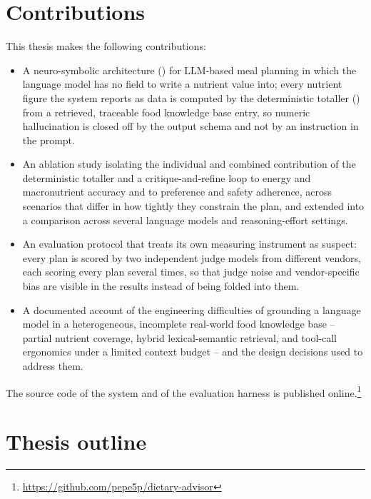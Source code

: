 \section{Contributions}
\label{sec:introduction-contributions}

This thesis makes the following contributions:

\begin{itemize}
    \item A neuro-symbolic architecture () for LLM-based meal planning in which the language model has no field to write a nutrient value into; every nutrient figure the system reports as data is computed by the deterministic totaller () from a retrieved, traceable food knowledge base entry, so numeric hallucination is closed off by the output schema and not by an instruction in the prompt.
    \item An ablation study isolating the individual and combined contribution of the deterministic totaller and a critique-and-refine loop to energy and macronutrient accuracy and to preference and safety adherence, across scenarios that differ in how tightly they constrain the plan, and extended into a comparison across several language models and reasoning-effort settings.
    \item An evaluation protocol that treats its own measuring instrument as suspect: every plan is scored by two independent judge models from different vendors, each scoring every plan several times, so that judge noise and vendor-specific bias are visible in the results instead of being folded into them.
    \item A documented account of the engineering difficulties of grounding a language model in a heterogeneous, incomplete real-world food knowledge base -- partial nutrient coverage, hybrid lexical-semantic retrieval, and tool-call ergonomics under a limited context budget -- and the design decisions used to address them.
\end{itemize}

The source code of the system and of the evaluation harness is published online.\footnote{\url{https://github.com/pepe5p/dietary-advisor}}

\section{Thesis outline}
\label{sec:introduction-outline}

